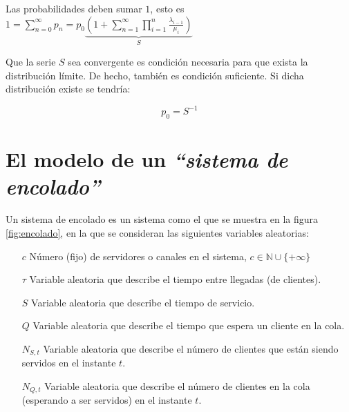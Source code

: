 \documentclass[a4paper,10pt]{scrartcl}
\theoremstyle{definition}
\numberwithin{equation}{section}
\begin{document}
Las probabilidades deben sumar $1$, esto es $1 = \sum_{n=0}^{\infty} p_n = p_0 \underbrace{\left(1 + \sum_{n=1}^{\infty} \prod_{i=1}^n \frac{\lambda_{i-1}}{\mu_i} \right)}_{S}$

Que la serie $S$ sea convergente es condición necesaria para que exista la distribución límite. 
De hecho, también es condición suficiente. Si dicha distribución existe se tendría: 

\begin{equation}
 p_0 = S^{-1} 
 \label{eq:relp0}
\end{equation}


\section{El modelo de un \textit{``sistema de encolado''}}
Un sistema de encolado es un sistema como el que se muestra en la figura \ref{fig:encolado}, en la que se consideran las siguientes variables aleatorias:

\begin{itemize}
\item [$c$]
  Número (fijo) de servidores o canales en el sistema, $c\in \mathbb{N} \cup \{+\infty\}$
\item [$\tau$]
  Variable aleatoria que describe el tiempo entre llegadas (de clientes).
\item [$S$]
  Variable aleatoria que describe el tiempo de servicio.
\item [$Q$]
  Variable aleatoria que describe el tiempo que espera un cliente en la cola.
\item [$N_{S,t}$]
  Variable aleatoria que describe el número de clientes que están siendo servidos en el instante $t$.
\item [$N_{Q,t}$]
  Variable aleatoria que describe el número de clientes en la cola (esperando a ser servidos) en el instante $t$.
\end{itemize}
\end{document}
